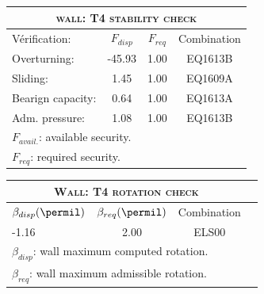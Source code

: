 \begin{center}
\begin{tabular}[H]{|l|c|c|c|}
\hline
\multicolumn{4}{|c|}{\textsc{wall: T4 stability check}}\\
\hline
Vérification:  & $F_{disp}$ & $F_{req}$ & Combination\\
\hline
Overturning:  & -45.93 & 1.00 & EQ1613B\\
Sliding:  & 1.45 & 1.00 & EQ1609A\\
Bearign capacity:  & 0.64 & 1.00 & EQ1613A\\
Adm. pressure:  & 1.08 & 1.00 & EQ1613B\\
\hline
\multicolumn{4}{|l|}{$F_{avail.}$: available security.}\\
\multicolumn{4}{|l|}{$F_{req}$: required security.}\\
\hline
\end{tabular}
\end{center}
\begin{center}
\begin{tabular}[H]{|l|c|c|c|}
\hline
\multicolumn{3}{|c|}{\textsc{Wall: T4 rotation check}}\\
\hline
$\beta_{disp} (\permil)$ & $\beta_{req}(\permil)$ & Combination\\
\hline
-1.16 & 2.00 & ELS00\\
\hline
\multicolumn{3}{|l|}{$\beta_{disp}$: wall maximum computed rotation.}\\
\multicolumn{3}{|l|}{$\beta_{req}$: wall maximum admissible rotation.}\\
\hline
\end{tabular}
\end{center}
 \label{tb_T4}
\tablelasttail{\hline}
